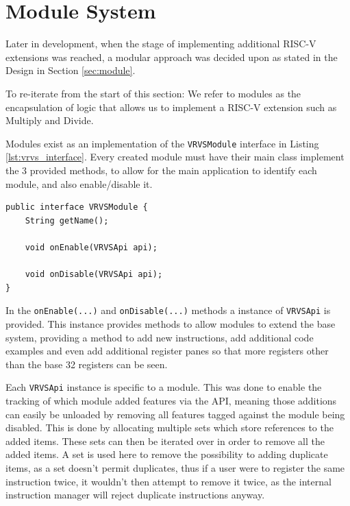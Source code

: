 \section{Module System}\label{sec:impl_mod}
Later in development, when the stage of implementing additional RISC-V \cite{fxmisc_2023_fxmiscrichtextfx} extensions was reached, a modular approach was decided upon as stated in the Design in Section \ref{sec:module}.

To re-iterate from the start of this section: We refer to modules as the encapsulation of logic that allows us to implement a RISC-V extension such as Multiply and Divide.

Modules exist as an implementation of the \texttt{VRVSModule} interface in Listing \ref{lst:vrvs_interface}. Every created module must have their main class implement the 3 provided methods, to allow for the main application to identify each module, and also enable/disable it.

\begin{lstlisting}[caption=\texttt{VRVSModule} interface for creating new modules, label=lst:vrvs_interface]
public interface VRVSModule {
    String getName();

    void onEnable(VRVSApi api);

    void onDisable(VRVSApi api);
}
\end{lstlisting}

In the \verb|onEnable(...)| and \verb|onDisable(...)| methods a instance of \texttt{VRVSApi} is provided. This instance provides methods to allow modules to extend the base system, providing a method to add new instructions, add additional code examples and even add additional register panes so that more registers other than the base 32 registers can be seen.

Each \texttt{VRVSApi} instance is specific to a module. This was done to enable the tracking of which module added features via the API, meaning those additions can easily be unloaded by removing all features tagged against the module being disabled. This is done by allocating multiple sets which store references to the added items. These sets can then be iterated over in order to remove all the added items. A set is used here to remove the possibility to adding duplicate items, as a set doesn't permit duplicates, thus if a user were to register the same instruction twice, it wouldn't then attempt to remove it twice, as the internal instruction manager will reject duplicate instructions anyway.

